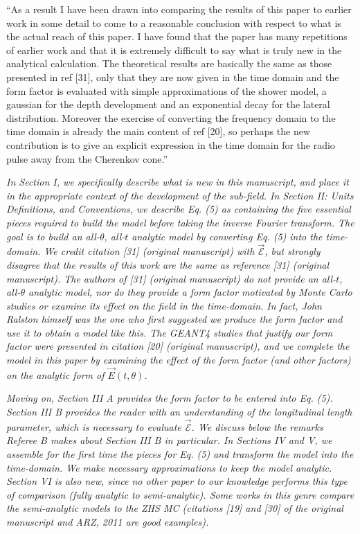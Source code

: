 \documentclass[12pt]{article}
\begin{document}
``As a result I have been drawn into comparing the results of this paper to earlier work in some detail to come to a reasonable conclusion with respect to what is the actual reach of this paper. I have found that the paper has many repetitions of earlier work and that it is extremely difficult to say what is truly new in the analytical calculation. The theoretical results are basically the same as those presented in ref [31], only that they are now given in the time domain and the form factor is evaluated with simple approximations of the shower model, a gaussian for the depth development and an exponential decay for the lateral distribution. Moreover the exercise of converting the frequency domain to the time domain is already the main content of ref [20], so perhaps the new contribution is to give an explicit expression in the time domain for the radio pulse away from the Cherenkov cone.''

\textit{In Section I, we specifically describe what is new in this manuscript, and place it in the appropriate context of the development of the sub-field.  In Section II: Units Definitions, and Conventions, we describe Eq. (5) as containing the five essential pieces required to build the model before taking the inverse Fourier transform.  The goal is to build an all-$\theta$, all-$t$ analytic model by converting Eq. (5) into the time-domain.  We credit citation [31] (original manuscript) with $\vec{\mathcal{E}}$, but strongly disagree that the results of this work are the same as reference [31] (original manuscript).  The authors of [31] (original manuscript) do not provide an all-$t$, all-$\theta$ analytic model, nor do they provide a form factor motivated by Monte Carlo studies or examine its effect on the field in the time-domain.  In fact, John Ralston himself was the one who first suggested we produce the form factor and use it to obtain a model like this.  The GEANT4 studies that justify our form factor were presented in citation [20] (original manuscript), and we complete the model in this paper by examining the effect of the form factor (and other factors) on the analytic form of $\vec{E}(t,\theta)$.}

\textit{Moving on, Section III A provides the form factor to be entered into Eq. (5).  Section III B provides the reader with an understanding of the longitudinal length parameter, which is necessary to evaluate $\vec{\mathcal{E}}$.  We discuss below the remarks Referee B makes about Section III B in particular.  In Sections IV and V, we assemble for the first time the pieces for Eq. (5) and transform the model into the time-domain.  We make necessary approximations to keep the model analytic.  Section VI is also new, since no other paper to our knowledge performs this type of comparison (fully analytic to semi-analytic).  Some works in this genre compare the semi-analytic models to the ZHS MC (citations [19] and [30] of the original manuscript and ARZ, 2011 are good examples).}
\end{document}

